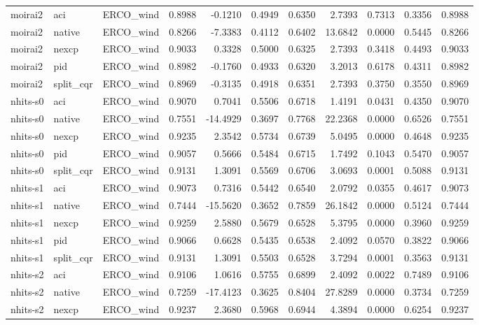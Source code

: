 \begin{tabular}{lllrrrrrrrr}
moirai2 & aci & ERCO_wind & 0.8988 & -0.1210 & 0.4949 & 0.6350 & 2.7393 & 0.7313 & 0.3356 & 0.8988 \\
moirai2 & native & ERCO_wind & 0.8266 & -7.3383 & 0.4112 & 0.6402 & 13.6842 & 0.0000 & 0.5445 & 0.8266 \\
moirai2 & nexcp & ERCO_wind & 0.9033 & 0.3328 & 0.5000 & 0.6325 & 2.7393 & 0.3418 & 0.4493 & 0.9033 \\
moirai2 & pid & ERCO_wind & 0.8982 & -0.1760 & 0.4933 & 0.6320 & 3.2013 & 0.6178 & 0.4311 & 0.8982 \\
moirai2 & split_cqr & ERCO_wind & 0.8969 & -0.3135 & 0.4918 & 0.6351 & 2.7393 & 0.3750 & 0.3550 & 0.8969 \\
nhits-s0 & aci & ERCO_wind & 0.9070 & 0.7041 & 0.5506 & 0.6718 & 1.4191 & 0.0431 & 0.4350 & 0.9070 \\
nhits-s0 & native & ERCO_wind & 0.7551 & -14.4929 & 0.3697 & 0.7768 & 22.2368 & 0.0000 & 0.6526 & 0.7551 \\
nhits-s0 & nexcp & ERCO_wind & 0.9235 & 2.3542 & 0.5734 & 0.6739 & 5.0495 & 0.0000 & 0.4648 & 0.9235 \\
nhits-s0 & pid & ERCO_wind & 0.9057 & 0.5666 & 0.5484 & 0.6715 & 1.7492 & 0.1043 & 0.5470 & 0.9057 \\
nhits-s0 & split_cqr & ERCO_wind & 0.9131 & 1.3091 & 0.5569 & 0.6706 & 3.0693 & 0.0001 & 0.5088 & 0.9131 \\
nhits-s1 & aci & ERCO_wind & 0.9073 & 0.7316 & 0.5442 & 0.6540 & 2.0792 & 0.0355 & 0.4617 & 0.9073 \\
nhits-s1 & native & ERCO_wind & 0.7444 & -15.5620 & 0.3652 & 0.7859 & 26.1842 & 0.0000 & 0.5124 & 0.7444 \\
nhits-s1 & nexcp & ERCO_wind & 0.9259 & 2.5880 & 0.5679 & 0.6528 & 5.3795 & 0.0000 & 0.3960 & 0.9259 \\
nhits-s1 & pid & ERCO_wind & 0.9066 & 0.6628 & 0.5435 & 0.6538 & 2.4092 & 0.0570 & 0.3822 & 0.9066 \\
nhits-s1 & split_cqr & ERCO_wind & 0.9131 & 1.3091 & 0.5503 & 0.6528 & 3.7294 & 0.0001 & 0.3563 & 0.9131 \\
nhits-s2 & aci & ERCO_wind & 0.9106 & 1.0616 & 0.5755 & 0.6899 & 2.4092 & 0.0022 & 0.7489 & 0.9106 \\
nhits-s2 & native & ERCO_wind & 0.7259 & -17.4123 & 0.3625 & 0.8404 & 27.8289 & 0.0000 & 0.3734 & 0.7259 \\
nhits-s2 & nexcp & ERCO_wind & 0.9237 & 2.3680 & 0.5968 & 0.6944 & 4.3894 & 0.0000 & 0.6254 & 0.9237 \\

\end{tabular}
